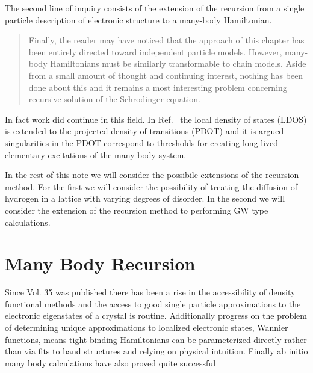 \documentclass{article}
\begin{document}
The second line of inquiry consists of the extension of the recursion from a single 
particle description of electronic structure to a many-body Hamiltonian.
%
\begin{quote}
Finally, the reader may have noticed that the approach of this chapter has been entirely directed
toward independent particle models. However, many-body Hamiltonians must be similarly 
transformable to chain models. Aside from a small amount of thought and continuing interest, 
nothing has been done about this and it remains a most interesting problem concerning recursive 
solution of the Schrodinger equation.
\end{quote}

In fact work did continue in this field. In Ref.~\cite{annett94} the local density of states (LDOS)
is extended to the projected density of transitions (PDOT) and it is argued singularities
in the PDOT correspond to thresholds for creating long lived elementary excitations 
of the many body system.

In the rest of this note we will consider the possibile extensions of the recursion method.
For the first we will consider the possibility of treating the diffusion of hydrogen 
in a lattice with varying degrees of disorder. In the second we will consider the extension
of the recursion method to performing GW type calculations.


\section{Many Body Recursion}
\label{sec:manybodyrecursion}
	Since Vol. 35 was published there has been a rise in the accessibility of density functional methods 
and the access to good single particle approximations to the electronic eigenstates of a crystal
is routine. Additionally progress on the problem of determining unique approximations to localized
electronic states, Wannier functions, means tight binding Hamiltonians can be parameterized directly
rather than via fits to band structures and relying on physical intuition. Finally ab initio many body
calculations have also proved quite successful
\end{document}
